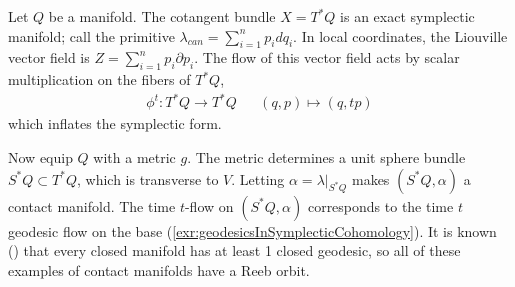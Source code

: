 

    Let $Q$ be a manifold. The cotangent bundle $X=T^*Q$ is an exact symplectic manifold; call the primitive $\lambda_{can}=\sum_{i=1}^np_idq_i$. In local coordinates, the Liouville vector field is $Z= \sum_{i=1}^n p_i \partial p_i$. The flow of this vector field acts by scalar multiplication on the fibers of $T^*Q$,
    \begin{align*}\phi^t: T^*Q\to T^*Q && (q, p) \mapsto (q, tp)\end{align*}
    which inflates the symplectic form.

    Now equip $Q$ with a metric $g$. The metric determines a unit sphere bundle $S^*Q\subset T^*Q$, which is transverse to $V$. Letting $\alpha=\lambda|_{S^*Q}$ makes  $(S^*Q, \alpha)$ a contact manifold. The time $t$-flow on  $(S^*Q, \alpha)$ corresponds to the time $t$ geodesic flow on the base (\cref{exr:geodesicsInSymplecticCohomology}). It is known (\cite{fet1952variational}) that every closed manifold has at least 1 closed geodesic, so all of these examples of contact manifolds have a Reeb orbit. 


